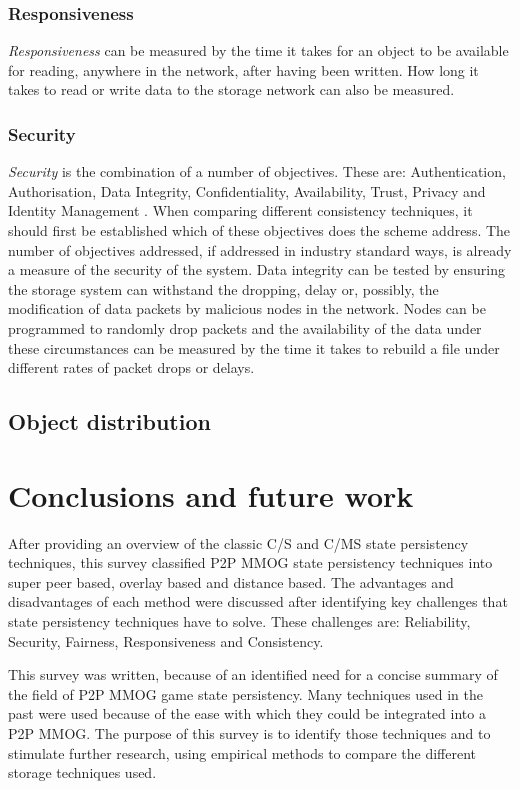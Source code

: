 \documentclass[10pt,a4paper,journal,cspaper,compsoc]{IEEEtran}
\begin{document}
\subsubsection{Responsiveness}
\emph{Responsiveness} can be measured by the time it takes for an object to be available for reading, anywhere in the network, after having been
written. How long it takes to read or write data to the storage network can also be measured.

\subsubsection{Security}
\emph{Security} is the combination of a number of objectives. These are: Authentication, Authorisation, Data Integrity, Confidentiality,
Availability, Trust, Privacy and Identity Management \cite{distributed_systems_security}. When comparing different consistency techniques, it should
first be established which of these objectives does the scheme address. The number of objectives addressed, if addressed in industry standard ways,
is already a measure of the security of the system. Data integrity can be tested by ensuring the storage system can withstand the dropping, delay or,
possibly, the modification of data packets by malicious nodes in the network. Nodes can be programmed to randomly drop packets and the availability
of the data under these circumstances can be measured by the time it takes to rebuild a file under different rates of packet drops or delays.

\subsection{Object distribution}

\section{Conclusions and future work}


After providing an overview of the classic C/S and C/MS state persistency techniques, this survey classified P2P MMOG state persistency techniques
into super peer based, overlay based and distance based. The advantages and disadvantages of each method were discussed after identifying key
challenges that state persistency techniques have to solve. These challenges are: Reliability, Security, Fairness, Responsiveness and Consistency.

This survey was written, because of an identified need for a concise summary of the field of P2P MMOG game state persistency. Many techniques used in
the past were used because of the ease with which they could be integrated into a P2P MMOG. The purpose of this survey is to identify those
techniques and to stimulate further research, using empirical methods to compare the different storage techniques used.





\end{document}
